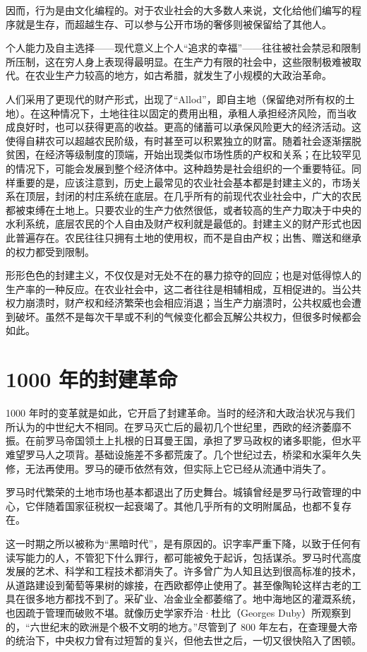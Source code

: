 因而，行为是由文化编程的。对于农业社会的大多数人来说，文化给他们编写的程序就是生存，而超越生存、可以参与公开市场的奢侈则被保留给了其他人。

个人能力及自主选择——现代意义上个人“追求的幸福”——往往被社会禁忌和限制所压制，这在穷人身上表现得最明显。在生产力有限的社会中，这些限制极难被取代。在农业生产力较高的地方，如古希腊，就发生了小规模的大政治革命。

人们采用了更现代的财产形式，出现了“Allod”，即自主地（保留绝对所有权的土地）。在这种情况下，土地往往以固定的费用出租，承租人承担经济风险，而当收成良好时，也可以获得更高的收益。更高的储蓄可以承保风险更大的经济活动。这使得自耕农可以超越农民阶级，有时甚至可以积累独立的财富。随着社会逐渐摆脱贫困，在经济等级制度的顶端，开始出现类似市场性质的产权和关系；在比较罕见的情况下，可能会发展到整个经济体中。这种趋势是社会组织的一个重要特征。同样重要的是，应该注意到，历史上最常见的农业社会基本都是封建主义的，市场关系在顶层，封闭的村庄系统在底层。在几乎所有的前现代农业社会中，广大的农民都被束缚在土地上。只要农业的生产力依然很低，或者较高的生产力取决于中央的水利系统，底层农民的个人自由及财产权利就是最低的。封建主义的财产形式也因此普遍存在。农民往往只拥有土地的使用权，而不是自由产权；出售、赠送和继承的权力都受到限制。

形形色色的封建主义，不仅仅是对无处不在的暴力掠夺的回应；也是对低得惊人的生产率的一种反应。在农业社会中，这二者往往是相辅相成，互相促进的。当公共权力崩溃时，财产权和经济繁荣也会相应消退；当生产力崩溃时，公共权威也会遭到破坏。虽然不是每次干旱或不利的气候变化都会瓦解公共权力，但很多时候都会如此。

\section{1000 年的封建革命}
1000 年时的变革就是如此，它开启了封建革命。当时的经济和大政治状况与我们所认为的中世纪大不相同。在罗马灭亡后的最初几个世纪里，西欧的经济萎靡不振。在前罗马帝国领土上扎根的日耳曼王国，承担了罗马政权的诸多职能，但水平难望罗马人之项背。基础设施差不多都荒废了。几个世纪过去，桥梁和水渠年久失修，无法再使用。罗马的硬币依然有效，但实际上它已经从流通中消失了。

罗马时代繁荣的土地市场也基本都退出了历史舞台。城镇曾经是罗马行政管理的中心，它伴随着国家征税权一起衰竭了。其他几乎所有的文明附属品，也都不复存在。

这一时期之所以被称为“黑暗时代”，是有原因的。识字率严重下降，以致于任何有读写能力的人，不管犯下什么罪行，都可能被免于起诉，包括谋杀。罗马时代高度发展的艺术、科学和工程技术都消失了。许多曾广为人知且达到很高标准的技术，从道路建设到葡萄等果树的嫁接，在西欧都停止使用了。甚至像陶轮这样古老的工具在很多地方都找不到了。采矿业、冶金业全都萎缩了。地中海地区的灌溉系统，也因疏于管理而破败不堪。就像历史学家乔治·杜比（Georges Duby）所观察到的，“六世纪末的欧洲是个极不文明的地方。”尽管到了 800 年左右，在查理曼大帝的统治下，中央权力曾有过短暂的复兴，但他去世之后，一切又很快陷入了困顿。


